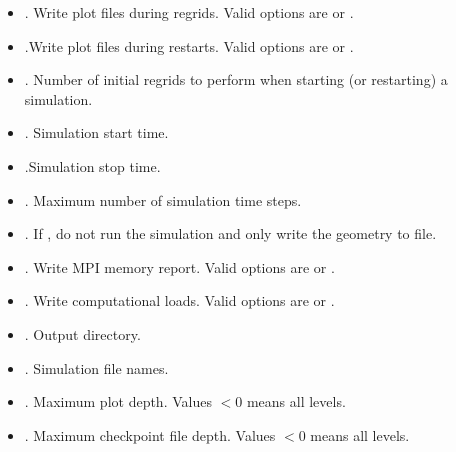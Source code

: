 \documentclass[letterpaper,10pt,english]{sphinxmanual}
\begin{document}
\begin{itemize}
\item {} 
. Write plot files during regrids. Valid options are  or .

\item {} 
.Write plot files during restarts. Valid options are  or .

\item {} 
. Number of initial regrids to perform when starting (or restarting) a simulation.

\item {} 
. Simulation start time.

\item {} 
.Simulation stop time.

\item {} 
. Maximum number of simulation time steps.

\item {} 
. If , do not run the simulation and only write the geometry to file.

\item {} 
. Write MPI memory report. Valid options are  or .

\item {} 
.  Write computational loads. Valid options are  or .

\item {} 
. Output directory.

\item {} 
. Simulation file names.

\item {} 
. Maximum plot depth.
Values \(< 0\) means all levels.

\item {} 
.  Maximum checkpoint file depth.
Values \(< 0\) means all levels.


\end{itemize}
\end{document}
